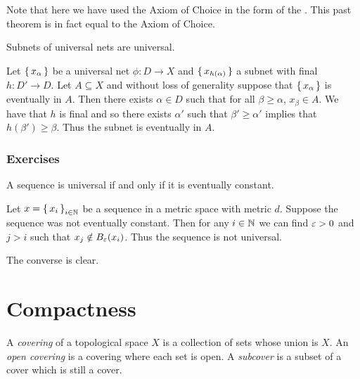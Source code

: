 \documentclass[letterpaper, 11pt, oneside]{book}
\begin{document}
Note that here we have used the Axiom of Choice in the form of the .
This past theorem is in fact equal to the Axiom of Choice.

\begin{prop}
  Subnets of universal nets are universal.
\end{prop}
\begin{pf}
  Let $\set{x_{\alpha}}$ be a universal net $\phi\colon D \to X$ and $\set{x_{h(\alpha)}}$ a subnet with final $h\colon D' \to D$.
  Let $A \subseteq X$ and without loss of generality suppose that $\set{x_{\alpha}}$ is eventually in $A$.
  Then there exists $\alpha \in D$ such that for all $\beta \geq \alpha$, $x_{\beta} \in A$.
  We have that $h$ is final and so there exists $\alpha'$ such that $\beta' \geq \alpha'$ implies that $h(\beta') \geq \beta$.
  Thus the subnet is eventually in $A$.
\end{pf}

\clearpage

\subsection*{Exercises}

\begin{exercise}
  A sequence is universal if and only if it is eventually constant.
\end{exercise}
\begin{pf}
  Let $x = \set{x_{i}}_{i \in \mathbb{N}}$ be a sequence in a metric space with metric $d$.
  Suppose the sequence was not eventually constant.
  Then for any $i \in \mathbb{N}$ we can find $\varepsilon > 0$ and $j > i$ such that $x_{j} \notin B_{\varepsilon}(x_{i})$.
  Thus the sequence is not universal.

  The converse is clear.
\end{pf}

\clearpage

\chapter{Compactness}

\begin{defn}
  A \emph{covering} of a topological space $X$ is a collection of sets whose union is $X$.
  An \emph{open covering} is a covering where each set is open.
  A \emph{subcover} is a subset of a cover which is still a cover.
\end{defn}
\end{document}
